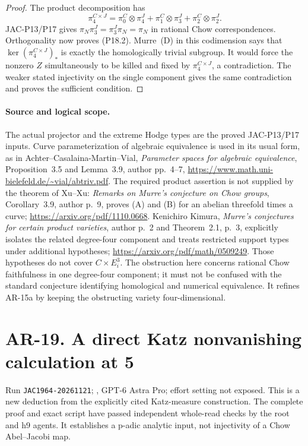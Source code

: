 \documentclass[11pt,a4paper]{article}
\begin{document}
\begin{proof}
The product decomposition has
\[
 \pi_4^{C\times J}
   =\pi_0^C\otimes\pi_4^J
      +\pi_1^C\otimes\pi_3^J
      +\pi_2^C\otimes\pi_2^J.
\]
JAC-P13/P17 gives
$\pi_N\pi_3^J=\pi_3^J\pi_N=\pi_N$ in rational Chow
correspondences. Orthogonality now proves (P18.2).
Murre~(D) in this codimension says that
$\ker(\pi_4^{C\times J})_*$ is exactly the homologically
trivial subgroup. It would force the nonzero $Z$ simultaneously
to be killed and fixed by $\pi_4^{C\times J}$, a contradiction.
The weaker stated injectivity on the single component gives the
same contradiction and proves the sufficient condition.
\end{proof}

\paragraph{Source and logical scope.}
The actual projector and the extreme Hodge types are the proved
JAC-P13/P17 inputs. Curve parameterization of algebraic
equivalence is used in its usual form, as in Achter--Casalaina-Martin--Vial,
\emph{Parameter spaces for algebraic equivalence},
Proposition~3.5 and Lemma~3.9, author pp.~4--7,
\url{https://www.math.uni-bielefeld.de/~vial/abtriv.pdf}.
The required product assertion is not supplied by the theorem of
Xu--Xu: \emph{Remarks on Murre's conjecture on Chow groups},
Corollary~3.9, author p.~9, proves (A) and (B) for an abelian
threefold times a curve;
\url{https://arxiv.org/pdf/1110.0668}.
Kenichiro Kimura, \emph{Murre's conjectures for certain product
varieties}, author p.~2 and Theorem~2.1, p.~3, explicitly isolates
the related degree-four component and treats restricted support
types under additional hypotheses;
\url{https://arxiv.org/pdf/math/0509249}.
Those hypotheses do not cover $C\times E_i^3$.
The obstruction here concerns rational Chow faithfulness in one
degree-four component; it must not be confused with the standard
conjecture identifying homological and numerical equivalence.
It refines AR-15a by keeping the obstructing variety four-dimensional.
\section{AR-19. A direct Katz nonvanishing calculation at
5}\label{ar-19.-a-direct-katz-nonvanishing-calculation-at-5}

Run \texttt{JAC1964-20261121}; , GPT-6
Astra Pro; effort setting not exposed. This is a new deduction from the
explicitly cited Katz-measure construction. The complete proof and exact
script have passed independent whole-read checks by the root and h9
agents. It establishes a p-adic analytic input, not injectivity of a
Chow Abel--Jacobi map.
\end{document}
